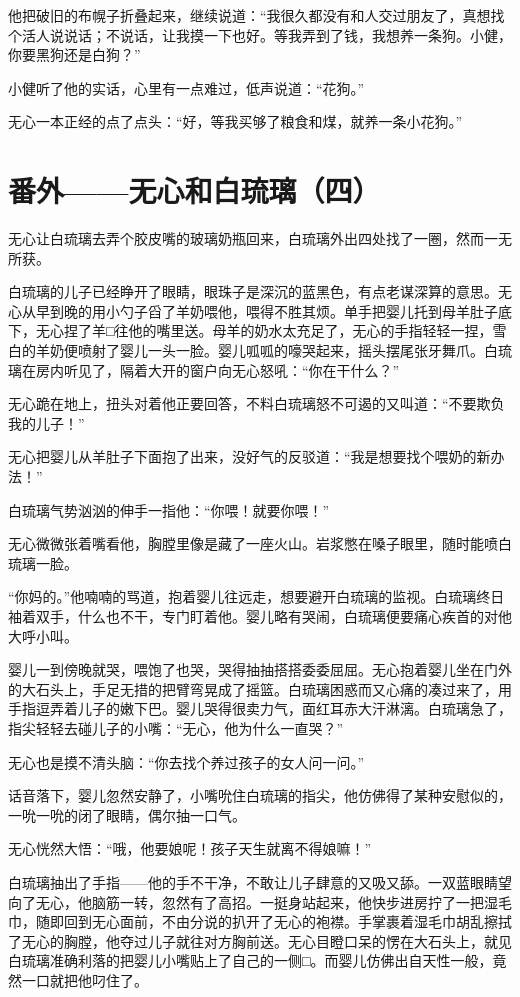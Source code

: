 他把破旧的布幌子折叠起来，继续说道：``我很久都没有和人交过朋友了，真想找个活人说说话；不说话，让我摸一下也好。等我弄到了钱，我想养一条狗。小健，你要黑狗还是白狗？''

小健听了他的实话，心里有一点难过，低声说道：``花狗。''

无心一本正经的点了点头：``好，等我买够了粮食和煤，就养一条小花狗。''

\chapter{番外——无心和白琉璃（四）}

无心让白琉璃去弄个胶皮嘴的玻璃奶瓶回来，白琉璃外出四处找了一圈，然而一无所获。

白琉璃的儿子已经睁开了眼睛，眼珠子是深沉的蓝黑色，有点老谋深算的意思。无心从早到晚的用小勺子舀了羊奶喂他，喂得不胜其烦。单手把婴儿托到母羊肚子底下，无心捏了羊□往他的嘴里送。母羊的奶水太充足了，无心的手指轻轻一捏，雪白的羊奶便喷射了婴儿一头一脸。婴儿呱呱的嚎哭起来，摇头摆尾张牙舞爪。白琉璃在房内听见了，隔着大开的窗户向无心怒吼：``你在干什么？''

无心跪在地上，扭头对着他正要回答，不料白琉璃怒不可遏的又叫道：``不要欺负我的儿子！''

无心把婴儿从羊肚子下面抱了出来，没好气的反驳道：``我是想要找个喂奶的新办法！''

白琉璃气势汹汹的伸手一指他：``你喂！就要你喂！''

无心微微张着嘴看他，胸膛里像是藏了一座火山。岩浆憋在嗓子眼里，随时能喷白琉璃一脸。

``你妈的。''他喃喃的骂道，抱着婴儿往远走，想要避开白琉璃的监视。白琉璃终日袖着双手，什么也不干，专门盯着他。婴儿略有哭闹，白琉璃便要痛心疾首的对他大呼小叫。

婴儿一到傍晚就哭，喂饱了也哭，哭得抽抽搭搭委委屈屈。无心抱着婴儿坐在门外的大石头上，手足无措的把臂弯晃成了摇篮。白琉璃困惑而又心痛的凑过来了，用手指逗弄着儿子的嫩下巴。婴儿哭得很卖力气，面红耳赤大汗淋漓。白琉璃急了，指尖轻轻去碰儿子的小嘴：``无心，他为什么一直哭？''

无心也是摸不清头脑：``你去找个养过孩子的女人问一问。''

话音落下，婴儿忽然安静了，小嘴吮住白琉璃的指尖，他仿佛得了某种安慰似的，一吮一吮的闭了眼睛，偶尔抽一口气。

无心恍然大悟：``哦，他要娘呢！孩子天生就离不得娘嘛！''

白琉璃抽出了手指——他的手不干净，不敢让儿子肆意的又吸又舔。一双蓝眼睛望向了无心，他脑筋一转，忽然有了高招。一挺身站起来，他快步进房拧了一把湿毛巾，随即回到无心面前，不由分说的扒开了无心的袍襟。手掌裹着湿毛巾胡乱擦拭了无心的胸膛，他夺过儿子就往对方胸前送。无心目瞪口呆的愣在大石头上，就见白琉璃准确利落的把婴儿小嘴贴上了自己的一侧□。而婴儿仿佛出自天性一般，竟然一口就把他叼住了。

